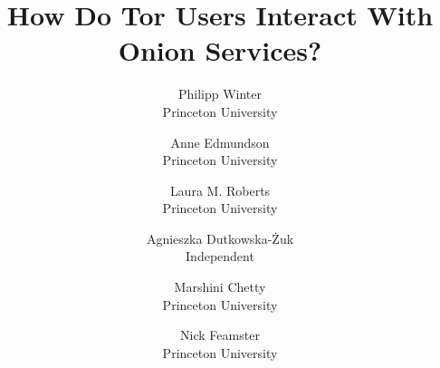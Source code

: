 \documentclass[letterpaper,twocolumn,10pt]{article}
\begin{document}
\date{}

\title{
    {\Large \textbf{How Do Tor Users Interact With Onion Services?}}
}

\author{
	\textup{\phantom{ZZZZ}Philipp Winter\phantom{ZZZZ}} \\
	Princeton University
	\and
	\textup{\phantom{ZZZZ}Anne Edmundson\phantom{ZZZZ}} \\
	Princeton University
	\and
	\textup{\phantom{ZZZ}Laura M. Roberts\phantom{ZZZ}} \\
	Princeton University
	\and
	\textup{Agnieszka Dutkowska-Żuk} \\
	Independent
	\and
	\textup{\phantom{ZZZZ}Marshini Chetty\phantom{ZZZZ}} \\
	Princeton University
	\and
	\textup{\phantom{ZZZZ}Nick Feamster\phantom{ZZZZ}} \\
	Princeton University
}

\maketitle

\thispagestyle{empty}



















\balance

{\footnotesize
\printbibliography}
\end{document}
